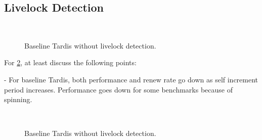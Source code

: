 \documentclass[12pt]{article}
\begin{document}
\subsection{Livelock Detection}

\begin{figure}
	\centering
	\\
	\caption{ Baseline Tardis without livelock detection. }
	\label{fig:self-nolive}
\end{figure}

For \cref{fig:self-nolive}, at least discuss the following points:

- For baseline Tardis, both performance and renew rate go down as self
  increment period increases. Performance goes down for some
  benchmarks because of spinning.

\begin{figure}
	\centering
	\\
	\caption{ Baseline Tardis without livelock detection. }
	\label{fig:self-nolive}
\end{figure}
\end{document}
